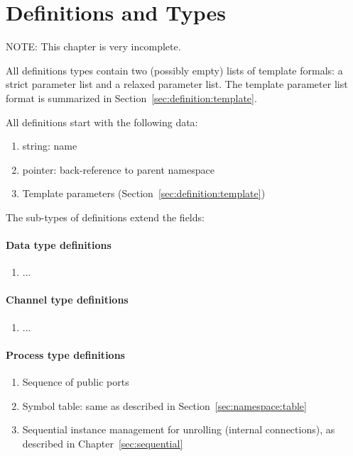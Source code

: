 
\chapter{Definitions and Types}
\label{sec:definition}

NOTE: This chapter is very incomplete.  

All definitions types contain two (possibly empty) lists of template
formals: a strict parameter list and a relaxed parameter list.  
The template parameter list format is summarized
in Section~\ref{sec:definition:template}.  

All definitions start with the following data:
\begin{enumerate}
\item string: name
\item pointer: back-reference to parent namespace
\item Template parameters (Section~\ref{sec:definition:template})
\end{enumerate}

The sub-types of definitions extend the fields:

\subsubsection{Data type definitions}
\begin{enumerate}
\item ...
\end{enumerate}

\subsubsection{Channel type definitions}
\begin{enumerate}
\item ...
\end{enumerate}

\subsubsection{Process type definitions}
\begin{enumerate}
\item Sequence of public ports
\item Symbol table: same as described in Section~\ref{sec:namespace:table}
\item Sequential instance management for unrolling (internal connections), 
	as described in Chapter~\ref{sec:sequential}
\end{enumerate}

